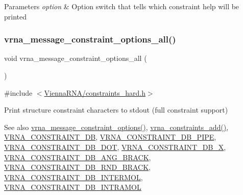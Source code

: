 \begin{DoxyParams}{Parameters}
{\em option} & Option switch that tells which constraint help will be printed \\
\hline
\end{DoxyParams}
\mbox{\label{group__constraints_gaec7e13fa0465c2acc7a621d1aecb709f}} 
\subsubsection{\texorpdfstring{vrna\+\_\+message\+\_\+constraint\+\_\+options\+\_\+all()}{vrna\_message\_constraint\_options\_all()}}
{\footnotesize\ttfamily void vrna\+\_\+message\+\_\+constraint\+\_\+options\+\_\+all (\begin{DoxyParamCaption}\item[{void}]{ }\end{DoxyParamCaption})}



{\ttfamily \#include $<$\mbox{\hyperlink{constraints__hard_8h}{Vienna\+R\+N\+A/constraints\+\_\+hard.\+h}}$>$}



Print structure constraint characters to stdout (full constraint support) 

\begin{DoxySeeAlso}{See also}
\mbox{\hyperlink{group__constraints_gaa1f20b53bf09ac2e6b0dbb13f7d89670}{vrna\+\_\+message\+\_\+constraint\+\_\+options()}}, \mbox{\hyperlink{group__constraints_ga35a401f680969a556858a8dd5f1d07cc}{vrna\+\_\+constraints\+\_\+add()}}, \mbox{\hyperlink{group__hard__constraints_ga4bfc2f15c4f261c62a11af9d2aa80c90}{V\+R\+N\+A\+\_\+\+C\+O\+N\+S\+T\+R\+A\+I\+N\+T\+\_\+\+DB}}, \mbox{\hyperlink{group__hard__constraints_ga13053547a2de5532b64b64d35e097ae1}{V\+R\+N\+A\+\_\+\+C\+O\+N\+S\+T\+R\+A\+I\+N\+T\+\_\+\+D\+B\+\_\+\+P\+I\+PE}}, \mbox{\hyperlink{group__hard__constraints_ga369bea82eae75fbe626f409fa425747e}{V\+R\+N\+A\+\_\+\+C\+O\+N\+S\+T\+R\+A\+I\+N\+T\+\_\+\+D\+B\+\_\+\+D\+OT}}, \mbox{\hyperlink{group__hard__constraints_ga7283bbe0f8954f7b030ecc3f2d1932b2}{V\+R\+N\+A\+\_\+\+C\+O\+N\+S\+T\+R\+A\+I\+N\+T\+\_\+\+D\+B\+\_\+X}}, \mbox{\hyperlink{constraints__hard_8h_ad54c1315a47d55653dcaa5de6e544b77}{V\+R\+N\+A\+\_\+\+C\+O\+N\+S\+T\+R\+A\+I\+N\+T\+\_\+\+D\+B\+\_\+\+A\+N\+G\+\_\+\+B\+R\+A\+CK}}, \mbox{\hyperlink{group__hard__constraints_gac17b034852c914bc5879954c65d7e74b}{V\+R\+N\+A\+\_\+\+C\+O\+N\+S\+T\+R\+A\+I\+N\+T\+\_\+\+D\+B\+\_\+\+R\+N\+D\+\_\+\+B\+R\+A\+CK}}, \mbox{\hyperlink{group__hard__constraints_ga31d0ebb9755ca8a4acafc14f00ca755d}{V\+R\+N\+A\+\_\+\+C\+O\+N\+S\+T\+R\+A\+I\+N\+T\+\_\+\+D\+B\+\_\+\+I\+N\+T\+E\+R\+M\+OL}}, \mbox{\hyperlink{group__hard__constraints_ga5c17253f5a39d1d49b0fb11f5196982a}{V\+R\+N\+A\+\_\+\+C\+O\+N\+S\+T\+R\+A\+I\+N\+T\+\_\+\+D\+B\+\_\+\+I\+N\+T\+R\+A\+M\+OL}} 
\end{DoxySeeAlso}
